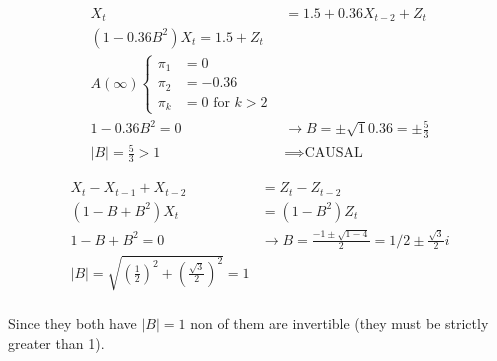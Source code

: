 \begin{example}{}{}
	\begin{align*}
		X_t                   & = 1.5 + 0.36X_{t-2} + Z_t \tag{AR(2)} \\
		(1 - 0.36B^2) X_t = 1.5 + Z_t                                 \\
		A(\infty) \begin{cases}
			          \pi_1 & = 0                    \\
			          \pi_2 & = -0.36                \\
			          \pi_k & = 0 \text{ for } k > 2
		          \end{cases}                      \\[2em]
		1 - 0.36B^2 = 0       & \rightarrow{} B = \pm \sqrt{1}{0.36}
		= \pm \frac{5}{3}                                             \\
		|B| = \frac{5}{3} > 1 & \implies{} \text{CAUSAL}
	\end{align*}

	\tcbline

	\begin{align*}
		X_t - X_{t-1} + X_{t-2} & = Z_t - Z_{t-2} \tag{ARMA(2,1)}               \\
		(1 - B + B^2) X_t       & = (1 - B^2) Z_t                               \\
		1 - B + B^2 = 0         & \rightarrow{} B = \frac{-1\pm\sqrt{1 - 4}}{2}
		= 1/2 \pm \frac{\sqrt{3}}{2}i                                           \\
		|B| = \sqrt{\left(\frac{1}{2}\right)^2 + \left(\frac{\sqrt{3}}{2}\right)^2}
		= 1                                                                     \\
	\end{align*}

	Since they both have $|B| = 1$ non of them are
	invertible (they must be strictly greater than 1).

	\begin{figure}[H]
	\end{figure}

\end{example}

